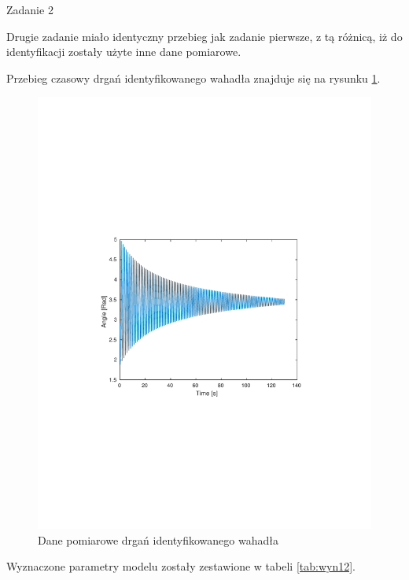 \documentclass[12pt]{article}
\begin{document}
  \begin{section}{Zadanie 2}
  
    Drugie zadanie miało identyczny przebieg jak zadanie pierwsze, z tą
    różnicą, iż do identyfikacji zostały użyte inne dane pomiarowe.
    
    Przebieg czasowy drgań identyfikowanego wahadła znajduje się na rysunku
    \ref{plot:sys12}.

    \begin{figure}[!htb]
      \begin{center}
        \includegraphics[width=14cm,trim=3cm 8.5cm 3cm 9cm,clip]
        {../res/img/sys12.pdf}
      \end{center}
      \caption{Dane pomiarowe drgań identyfikowanego wahadła}
      \label{plot:sys12}
    \end{figure}
    
    Wyznaczone parametry modelu zostały zestawione w tabeli \ref{tab:wyn12}.


\end{section}
\end{document}
